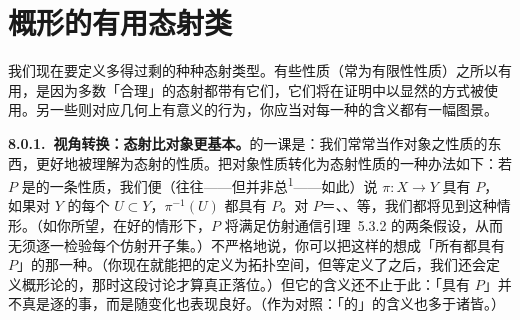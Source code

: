 
\chapter{概形的有用态射类}
\label{ch:useful-morphisms}

我们现在要定义多得过剩的种种态射类型。有些性质（常为有限性性质）之所以有用，是因为多数「合理」的态射都带有它们，它们将在证明中以显然的方式被使用。另一些则对应几何上有意义的行为，你应当对每一种的含义都有一幅图景。

\textbf{8.0.1.\ 视角转换：态射比对象更基本。}\quad \trGrothendieck{}的一课是：我们常常当作对象之性质的东西，更好地被理解为态射的性质。把对象性质转化为态射性质的一种办法如下：若 $P$ 是\trScheme{}的一条性质，我们便（往往——但并非总\textsuperscript{1}——如此）说\trMorphism{} $\pi\colon X\to Y$ 具有 $P$，如果对 $Y$ 的每个\trAffine\trOpenSubset{} $U\subset Y$，$\pi^{-1}(U)$ 都具有 $P$。对 $P$＝\trQuasicompact、\trQuasiSeparated、\trAffine{}等，我们都将见到这种情形。（如你所望，在好的情形下，$P$ 将满足仿射通信引理~5.3.2 的两条假设，从而无须逐一检验每个仿射开子集。）不严格地说，你可以把这样的\trMorphism{}想成「所有\trFiber{}都具有 $P$」的那一种。（你现在就能把\trMorphism{}的\trFiber{}定义为拓扑空间，但等定义了\trFiberProduct{}之后，我们还会定义概形论的\trFiber{}，那时这段讨论才算真正落位。）但它的含义还不止于此：「具有 $P$」并不真是逐\trFiber{}的事，而是随\trFiber{}变化也表现良好。（作为对照：「\trManifold{}的\trSubmersion{}」的含义也多于诸\trFiber{}皆\trSmooth{}。）





